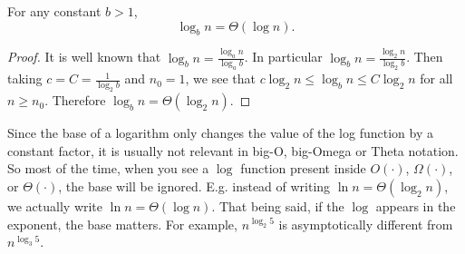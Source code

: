 \begin{flex}
\begin{proposition} \label{proposition:Logarithms-in-different-bases}
For any constant $b > 1$,
\[
\log_b n = \Theta(\log n).
\]
\end{proposition}

\begin{proof}
It is well known that $\log_b n = \frac{\log_a n}{\log_a b}$. In particular $\log_b n = \frac{\log_2 n}{\log_2 b}$. Then taking $c = C = \frac{1}{\log_2 b}$ and $n_0 = 1$, we see that $c \log_2 n \leq \log_b n \leq C \log_2 n$ for all $n \geq n_0$. Therefore $\log_b n = \Theta(\log_2 n)$. 
\end{proof}
\end{flex}


\begin{note} \label{note:Does-the-base-of-a-logarithm-matter}
Since the base of a logarithm only changes the value of the log function by a constant factor, it is usually not relevant in big-O, big-Omega or Theta notation. So most of the time, when you see a $\log$ function present inside $O(\cdot)$, $\Omega(\cdot)$, or $\Theta(\cdot)$, the base will be ignored. E.g. instead of writing $\ln n = \Theta(\log_2 n)$, we actually write $\ln n = \Theta(\log n)$. That being said, if the $\log$ appears in the exponent, the base matters. For example, $n^{\log_2 5}$ is asymptotically different from $n^{\log_3 5}$.
\end{note}


